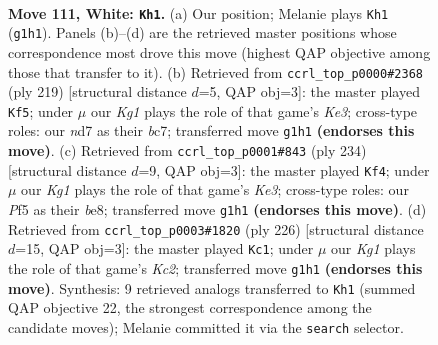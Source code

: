 \documentclass[11pt]{article}
\begin{document}
\clearpage

\begin{figure}[p]\centering
\begin{subfigure}{0.46\textwidth}\centering
\resizebox{\linewidth}{!}{%
\newchessgame
\chessboard[
  setfen={7k/3n4/8/5P2/p7/P6P/5B2/6K1 w - - 41 111},
  showmover=false,
  pgfstyle=straightmove, color=movearrow, markmove={g1-h1}
]}
\caption{}
\end{subfigure}\hfill
\begin{subfigure}{0.46\textwidth}\centering
\resizebox{\linewidth}{!}{%
\newchessgame
\chessboard[
  setfen={8/2Bb4/p3k3/7p/7P/K7/8/8 b - - 49 110},
  showmover=false,
  pgfstyle=straightmove, color=movearrow, markmove={e6-f5}
]}
\caption{}
\end{subfigure}
\\[4pt]
\begin{subfigure}{0.46\textwidth}\centering
\resizebox{\linewidth}{!}{%
\newchessgame
\chessboard[
  setfen={4b3/1p5k/8/8/8/1p2K3/1P3B2/8 w - - 4 118},
  showmover=false,
  pgfstyle=straightmove, color=movearrow, markmove={e3-f4}
]}
\caption{}
\end{subfigure}\hfill
\begin{subfigure}{0.46\textwidth}\centering
\resizebox{\linewidth}{!}{%
\newchessgame
\chessboard[
  setfen={8/8/8/p2k4/Pp6/3B4/2K5/8 w - - 81 114},
  showmover=false,
  pgfstyle=straightmove, color=movearrow, markmove={c2-c1}
]}
\caption{}
\end{subfigure}
\caption{\textbf{Move 111, White: \texttt{Kh1}.} (a) Our position; Melanie plays \texttt{Kh1} (\texttt{g1h1}). Panels (b)--(d) are the retrieved master positions whose correspondence most drove this move (highest QAP objective among those that transfer to it). (b) Retrieved from \texttt{ccrl\_top\_p0000\#2368} (ply 219) [structural distance $d$=5, QAP obj=3]: the master played \texttt{Kf5}; under $\mu$ our \emph{Kg1} plays the role of that game's \emph{Ke3}; cross-type roles: our \emph{n}d7 as their \emph{b}c7; transferred move \texttt{g1h1} \textbf{(endorses this move)}. (c) Retrieved from \texttt{ccrl\_top\_p0001\#843} (ply 234) [structural distance $d$=9, QAP obj=3]: the master played \texttt{Kf4}; under $\mu$ our \emph{Kg1} plays the role of that game's \emph{Ke3}; cross-type roles: our \emph{P}f5 as their \emph{b}e8; transferred move \texttt{g1h1} \textbf{(endorses this move)}. (d) Retrieved from \texttt{ccrl\_top\_p0003\#1820} (ply 226) [structural distance $d$=15, QAP obj=3]: the master played \texttt{Kc1}; under $\mu$ our \emph{Kg1} plays the role of that game's \emph{Kc2}; transferred move \texttt{g1h1} \textbf{(endorses this move)}. Synthesis: 9 retrieved analogs transferred to \texttt{Kh1} (summed QAP objective 22, the strongest correspondence among the candidate moves); Melanie committed it via the \texttt{search} selector.}
\label{fig:thought-m220}
\end{figure}
\end{document}

